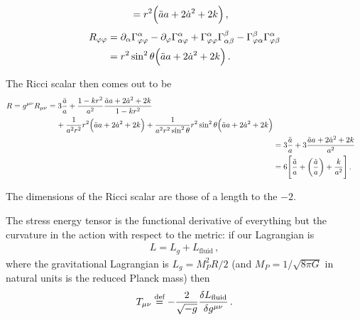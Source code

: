 \documentclass[main.tex]{subfiles}
\begin{document}
\begin{claim}
\begin{subequations}
\begin{align}
&= r^2 \qty(\ddot{a} a + 2\dot{a}^2 + 2k)
\,,
\end{align} 
\end{subequations}
%
\begin{subequations}
\begin{align}
R_{ \varphi \varphi } &= \partial_{\alpha } \Gamma^{\alpha }_{\varphi \varphi } - \partial_{\varphi } \Gamma^{\alpha }_{\alpha \varphi } + \Gamma^{\alpha }_{\varphi \varphi } \Gamma^{\beta }_{\alpha \beta } - \Gamma^{\beta }_{\varphi \alpha } \Gamma^{\alpha }_{\varphi \beta }  \\
&= r^2 \sin^2\theta \qty(\ddot{a} a + 2 \dot{a}^2 + 2k) 
\,.
\end{align}
\end{subequations}
\end{claim}

The Ricci scalar then comes out to be 
%
\begin{subequations}
\begin{align}
\begin{split}
R = g^{\mu \nu } R_{\mu \nu } 
&= 3 \frac{\ddot{a}}{a} 
+ \frac{1-kr^2}{a^2} \frac{\ddot{a}
 a + 2 \dot{a}^2 + 2k}{1 - kr^2} \\
 &\phantom{=}\ 
+ \frac{1}{a^2r^2} r^2 \qty(\ddot{a} a + 2 \dot{a}^2 + 2k)
+ \frac{1}{a^2r^2 \sin^2\theta }
r^2 \sin^2\theta  \qty(\ddot{a} a + 2 \dot{a}^2 + 2k) 
\end{split}
\\
&= 3 \frac{\ddot{a}}{a} + 3 \frac{\ddot{a}a + 2 \dot{a}^2 + 2k}{a^2}
\\
&= 6 \qty[\frac{\ddot{a}}{a} + \qty(\frac{\dot{a}}{a}) + \frac{k}{a^2}]
\,.
\end{align}
\end{subequations}

The dimensions of the Ricci scalar are those of a length to the \(-2\). 

The stress energy tensor is the functional derivative of everything but the curvature in the action with respect to the metric: if our Lagrangian is 
%
\begin{align}
L = L_{g} + L_{\text{fluid}}
\,,
\end{align}
%
where the gravitational Lagrangian is \(L_{g} = M_P^2 R /2 \) (and \(M_P = 1 / \sqrt{8 \pi G}\) in natural units is the reduced Planck mass) then 
%
\begin{align}
T_{\mu \nu } \overset{\text{def}}{=} -\frac{2}{\sqrt{-g}} \fdv{L_{\text{fluid}}}{g^{\mu \nu }}
\,.
\end{align}
\end{document}
